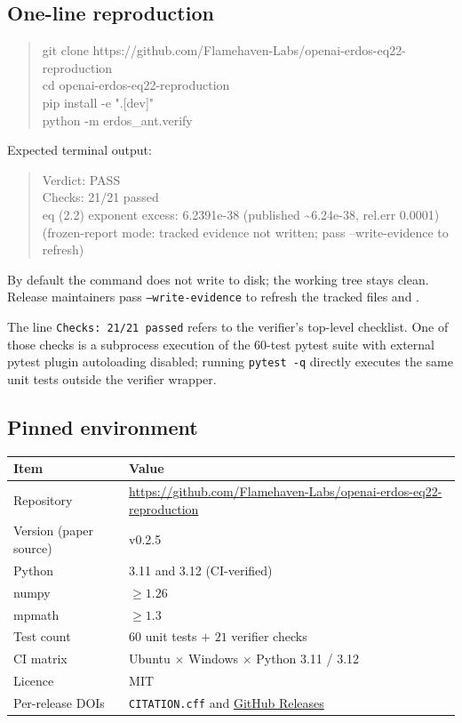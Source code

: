 
\subsection{One-line reproduction}

\begin{quote}\ttfamily
git clone https://github.com/Flamehaven-Labs/openai-erdos-eq22-reproduction\\
cd openai-erdos-eq22-reproduction\\
pip install -e ".[dev]"\\
python -m erdos\_ant.verify
\end{quote}

\noindent
Expected terminal output:

\begin{quote}\ttfamily
Verdict: PASS\\
Checks: 21/21 passed\\
eq (2.2) exponent excess: 6.2391e-38 (published \textasciitilde 6.24e-38, rel.err 0.0001)\\
(frozen-report mode: tracked evidence not written; pass --write-evidence to refresh)
\end{quote}

\noindent
By default the command does not write to disk; the working tree stays
clean. Release maintainers pass \texttt{--write-evidence} to refresh the
tracked files
 and
.

The line \texttt{Checks: 21/21 passed} refers to the verifier's
top-level checklist. One of those checks is a subprocess execution of
the $60$-test pytest suite with external pytest plugin autoloading
disabled; running \texttt{pytest -q} directly executes the same unit
tests outside the verifier wrapper.

\subsection{Pinned environment}

\begin{tabularx}{\textwidth}{@{}p{}X@{}}
\toprule
Item & Value \\
\midrule
Repository & \url{https://github.com/Flamehaven-Labs/openai-erdos-eq22-reproduction} \\
Version (paper source) & v0.2.5 \\
Python & 3.11 and 3.12 (CI-verified) \\
numpy & $\geq 1.26$ \\
mpmath & $\geq 1.3$ \\
Test count & $60$ unit tests $+$ $21$ verifier checks \\
CI matrix & Ubuntu $\times$ Windows $\times$ Python 3.11 / 3.12 \\
Licence & MIT \\
Per-release DOIs & \texttt{CITATION.cff} and \href{https://github.com/Flamehaven-Labs/openai-erdos-eq22-reproduction/releases}{GitHub Releases} \\
\bottomrule
\end{tabularx}

